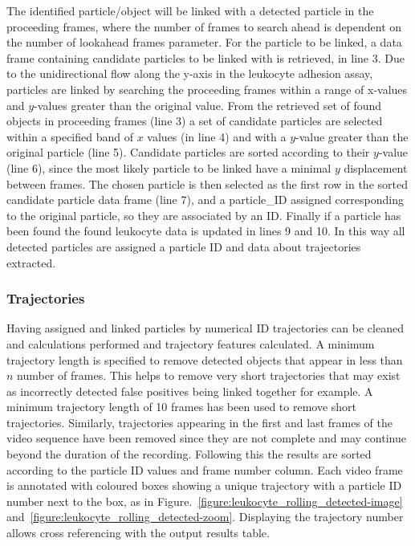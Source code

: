 The identified particle/object will be linked with a detected particle in the proceeding frames, where the number of frames to search ahead is dependent on the number of lookahead frames parameter. For the particle to be linked, a data frame containing candidate particles to be linked with is retrieved, in line 3. Due to the unidirectional flow along the y-axis in the leukocyte adhesion assay, particles are linked by searching the proceeding frames within a range of x-values and $y$-values greater than the original value. From the retrieved set of found objects in proceeding frames (line 3) a set of candidate particles are selected within a specified band of $x$ values (in line 4) and with a $y$-value greater than the original particle (line 5). Candidate particles are sorted according to their $y$-value (line 6), since the most likely particle to be linked have a minimal $y$ displacement between frames. The chosen particle is then selected as the first row in the sorted candidate particle data frame (line 7), and a particle\_ID assigned corresponding to the original particle, so they are associated by an ID. Finally if a particle has been found the found leukocyte data is updated in lines 9 and 10. In this way all detected particles are assigned a particle ID and data about trajectories extracted.

\subsubsection{Trajectories}
Having assigned and linked particles by numerical ID trajectories can be cleaned and calculations performed and trajectory features calculated. A minimum trajectory length is specified to remove detected objects that appear in less than $n$ number of frames. This helps to remove very short trajectories that may exist as incorrectly detected false positives being linked together for example. A minimum trajectory length of 10 frames has been used to remove short trajectories. Similarly, trajectories appearing in the first and last frames of the video sequence have been removed since they are not complete and may continue beyond the duration of the recording. Following this the results are sorted according to the particle ID values and frame number column. Each video frame is annotated with coloured boxes showing a unique trajectory with a particle ID number next to the box, as in Figure.~\ref{figure:leukocyte_rolling_detected-image} and~\ref{figure:leukocyte_rolling_detected-zoom}. Displaying the trajectory number allows cross referencing with the output results table.

